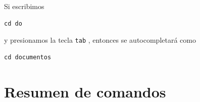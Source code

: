 \documentclass[11pt,a4paper]{article}
\begin{document}
Si escribimos 


\begin{lstlisting}
cd do
\end{lstlisting}


\noindent y presionamos la tecla \texttt{tab} \keys{\tab}, entonces se autocompletará como


\begin{lstlisting}
cd documentos
\end{lstlisting}






















\newpage
\appendix
\section{Resumen de comandos}
\end{document}

